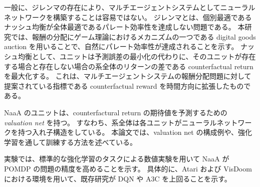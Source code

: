 一般に、ジレンマの存在により、マルチエージェントシステムとしてニューラルネットワークを構築することは容易ではない。
ジレンマとは、個別最適であるナッシュ均衡が全体最適であるパレート効率性を達成しない問題である。
本研究では、報酬の分配にゲーム理論におけるメカニズムの一つである digital goods auction \citep{guruswami2005profit} を用いることで、自然にパレート効率性が達成されることを示す。
ナッシュ均衡として、ユニットは予測誤差の最小化の代わりに、そのユニットが存在する場合と存在しない場合の系全体のリターンの差である counterfactual return を最大化する。
これは、マルチエージェントシステムの報酬分配問題に対して提案されている指標である counterfactual reward \citep{agogino2006quicr} を時間方向に拡張したものである。

NaaA のユニットは、counterfactural return の期待値を予測するための
{\em valuation net} を持つ。
すなわち、系全体は各ユニットがニューラルネットワークを持つ入れ子構造をしている。
本論文では、valuation net の構成例や、強化学習を通して訓練する方法を述べている。


実験では、標準的な強化学習のタスクによる数値実験を用いて NaaA が POMDP の問題の精度を高めることを示す。
具体的に、Atari および VisDoom における環境を用いて、既存研究が DQN や A3C を上回ることを示す。
